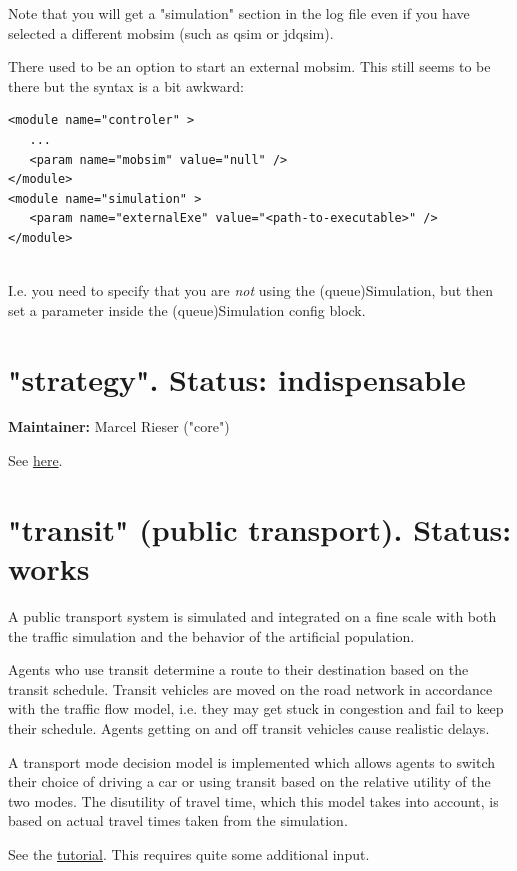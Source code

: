 Note that you will get a "simulation" section in the log file even if  you have selected a different mobsim (such as qsim or jdqsim).

There used to be an option to start an external mobsim. This still seems to be there but the syntax is a bit awkward:
\begin{verbatim}
<module name="controler" >
   ...
   <param name="mobsim" value="null" />
</module>
<module name="simulation" >
   <param name="externalExe" value="<path-to-executable>" />
</module>


\end{verbatim}

I.e. you need to specify that you are \emph{not} using the (queue)Simulation, but then set a parameter inside the (queue)Simulation config block.

\vfill\eject
\section{"strategy". Status: indispensable}

\textbf{Maintainer:} Marcel Rieser ("core")

See \href{http://matsim.org/node/478}{here}.

\vfill\eject
\section{"transit" (public transport).  Status: works}

A  public transport system is simulated and integrated on a fine scale  with both the traffic simulation and the behavior of the artificial  population.

Agents who use transit determine a route to their destination based  on the transit schedule. Transit vehicles are moved on the road network  in accordance with the traffic flow model, i.e. they may get stuck in  congestion and fail to keep their schedule. Agents getting on and off  transit vehicles cause realistic delays.

A transport mode decision model is implemented which allows agents to  switch their choice of driving a car or using transit based on the  relative utility of the two modes. The disutility of travel time, which  this model takes into account, is based on actual travel times taken  from the simulation.

See the \href{http://matsim.org/docs/tutorials/transit}{tutorial}. This requires quite some additional input.

